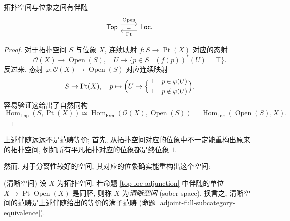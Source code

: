 \begin{prop}
	[label={top-loc-adjunction}]
	{}
	拓扑空间与位象之间有伴随
	\[\begin{tikzcd}[ampersand replacement=\&]
		{\mathsf {Top}} \& {\mathsf {Loc}.}
		\arrow[""{name=0, anchor=center, inner sep=0}, "{\operatorname{Open}}", shift left=2, from=1-1, to=1-2]
		\arrow[""{name=1, anchor=center, inner sep=0}, "{\operatorname{Pt}}", shift left=2, from=1-2, to=1-1]
		\arrow["\dashv"{anchor=center, rotate=-90}, draw=none, from=0, to=1]
	\end{tikzcd}\]
\end{prop}
\begin{proof}
	对于拓扑空间 $S$ 与位象 $X$,
	连续映射 $f\colon S \to \operatorname{Pt}(X)$
	对应\fm{}的态射 $$ \mathcal O(X) \to \operatorname{Open}(S),\quad U\mapsto \{p\in S \mid (f(p))^*(U)=\top\}.$$
	反过来, 态射 $\varphi\colon \mathcal O(X) \to \operatorname{Open}(S)$
	对应连续映射
	\[
	S\to\operatorname{Pt}(X),\quad
	p\mapsto \Big(U\mapsto \Bigl\{\,{\small \begin{aligned}
		\top &\ \ \ p\in\varphi(U)\\
		\bot &\ \ \ p\notin \varphi(U)
	\end{aligned}}\Bigr.\,\Big).
	\]
	容易验证这给出了自然同构
	\[
	\operatorname{Hom}_{\mathsf {Top}}(S,\operatorname{Pt}(X)) \simeq\operatorname{Hom}_{\mathsf {Frm}}(\mathcal O(X),\operatorname{Open}(S)) = \operatorname{Hom}_{\mathsf {Loc}} (\operatorname{Open}(S),X).
	\]
\end{proof}

上述伴随远远不是范畴等价; 首先, 从拓扑空间对应的位象中不一定能重构出原来的拓扑空间, 例如所有平凡拓扑对应的位象都是终位象 $1$.

然而, 对于分离性较好的空间, 其对应的位象确实能重构出这个空间:
\begin{definition}
	{(清晰空间)}
	设 $X$ 为拓扑空间. 若命题 \ref{top-loc-adjunction} 中伴随的单位 $X \to \operatorname{Pt}\operatorname{Open}(X)$ 是同胚,
	则称 $X$ 为\emph{清晰空间} (sober space\footnotemark). 换言之, 清晰空间的范畴是上述伴随给出的等价的满子范畴 (命题 \ref{adjoint-full-subcategory-equivalence}).
\end{definition}

